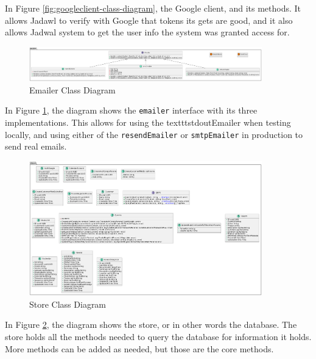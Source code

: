 In Figure \ref{fig:googleclient-class-diagram}, the Google client, and its methods. It allows Jadawl to verify with Google that tokens its gets are good, and it also allows Jadwal system to get the user info the system was granted access for.

\newpage
    
\begin{figure}[!h]
    \centering
    \includegraphics[width=0.9\textwidth]{images/docs/diagrams/class/class-diagram/emailer.png}
    \caption{Emailer Class Diagram}
    \label{fig:emailer-class-diagram}
\end{figure}

In Figure \ref{fig:emailer-class-diagram}, the diagram shows the \texttt{emailer} interface with its three implementations. This allows for using the texttt{stdoutEmailer} when testing locally, and using either of the \texttt{resendEmailer} or \texttt{smtpEmailer} in production to send real emails.

\newpage
    
\begin{figure}[!h]
    \centering
    \includegraphics[width=0.9\textwidth]{images/docs/diagrams/class/class-diagram/store.png}
    \caption{Store Class Diagram}
    \label{fig:store-class-diagram}
\end{figure}

In Figure \ref{fig:store-class-diagram}, the diagram shows the store, or in other words the database. The store holds all the methods needed to query the database for information it holds. More methods can be added as needed, but those are the core methods.


